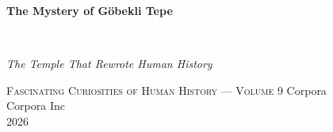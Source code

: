\clearpage
\vspace*{1.5in}
\begin{center}
  \begin{minipage}{\textwidth}
    \centering
    \Huge\bfseries
    \linespread{1.25}\selectfont
    The Mystery of Göbekli Tepe
  \end{minipage}
  \\[3em]
  {\Large\itshape\linespread{1.3}\selectfont
  The Temple That Rewrote Human History\par}
  \vspace{2em}
  {\small\scshape Fascinating Curiosities of Human History — Volume 9}
  \vfill
  {\large Corpora}
  \\[1em]
  {\large Corpora Inc}
  \\[1em]
  {\large 2026}
\end{center}
\clearpage

